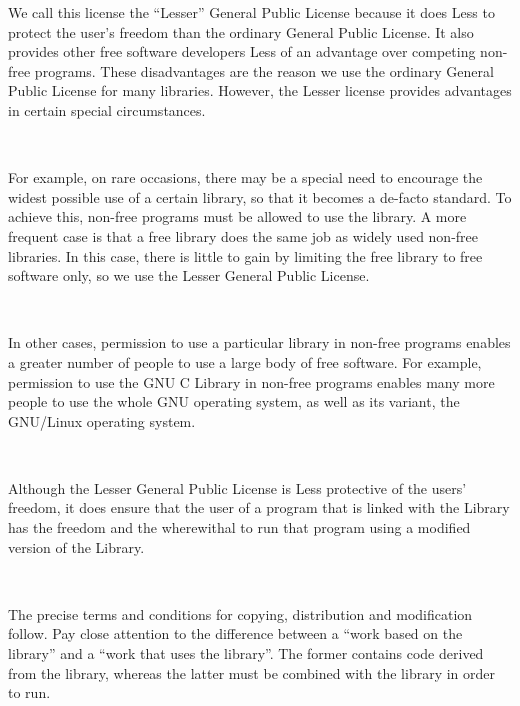 \begin{center}
\begin{minipage}{5.25in}
We call this license the ``Lesser'' General Public License because it
does Less to protect the user's freedom than the ordinary General
Public License.  It also provides other free software developers Less
of an advantage over competing non-free programs.  These disadvantages
are the reason we use the ordinary General Public License for many
libraries.  However, the Lesser license provides advantages in certain
special circumstances.
\end{minipage}
\\[2.5mm]

\begin{minipage}{5.25in}
For example, on rare occasions, there may be a special need to
encourage the widest possible use of a certain library, so that it becomes
a de-facto standard.  To achieve this, non-free programs must be
allowed to use the library.  A more frequent case is that a free
library does the same job as widely used non-free libraries.  In this
case, there is little to gain by limiting the free library to free
software only, so we use the Lesser General Public License.
\end{minipage}
\\[2.5mm]

\begin{minipage}{5.25in}
In other cases, permission to use a particular library in non-free
programs enables a greater number of people to use a large body of
free software.  For example, permission to use the GNU C Library in
non-free programs enables many more people to use the whole GNU
operating system, as well as its variant, the GNU/Linux operating
system.
\end{minipage}
\\[2.5mm]

\begin{minipage}{5.25in}
Although the Lesser General Public License is Less protective of the
users' freedom, it does ensure that the user of a program that is
linked with the Library has the freedom and the wherewithal to run
that program using a modified version of the Library.
\end{minipage}
\\[2.5mm]

\begin{minipage}{5.25in}
The precise terms and conditions for copying, distribution and
modification follow.  Pay close attention to the difference between a
``work based on the library'' and a ``work that uses the library''.  The
former contains code derived from the library, whereas the latter must
be combined with the library in order to run.
\end{minipage}
\end{center}
\smallskip

